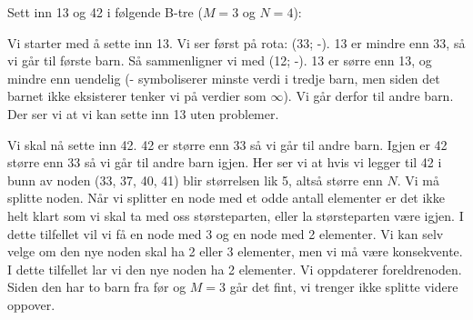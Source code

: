 \begin{eks} Sett inn 13 og 42 i følgende B-tre ($ M = 3 $ og $ N = 4 $):
\begin{figure}[H]
\centering
{}
\end{figure}

Vi starter med å sette inn 13. Vi ser først på rota: (33; -). 13 er mindre enn 33, så vi går til første barn. Så sammenligner vi med (12; -). 13 er sørre enn 13, og mindre enn uendelig (- symboliserer minste verdi i tredje barn, men siden det barnet ikke eksisterer tenker vi på verdier som $ \infty $). Vi går derfor til andre barn. Der ser vi at vi kan sette inn 13 uten problemer. 

Vi skal nå sette inn 42. 42 er større enn 33 så vi går til andre barn. Igjen er 42 større enn 33 så vi går til andre barn igjen. Her ser vi at hvis vi legger til 42 i bunn av noden (33, 37, 40, 41) blir størrelsen lik 5, altså større enn $ N $. Vi må splitte noden. Når vi splitter en node med et odde antall elementer er det ikke helt klart som vi skal ta med oss størsteparten, eller la størsteparten være igjen. I dette tilfellet vil vi få en node med 3 og en node med 2 elementer. Vi kan selv velge om den nye noden skal ha 2 eller 3 elementer, men vi må være konsekvente. I dette tilfellet lar vi den nye noden ha 2 elementer. Vi oppdaterer foreldrenoden. Siden den har to barn fra før og $ M=3 $ går det fint, vi trenger ikke splitte videre oppover. 


\end{eks}
